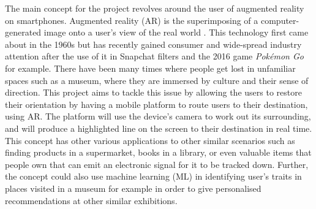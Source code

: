 The main concept for the project revolves around the user of augmented reality on smartphones. Augmented reality (AR) is the superimposing of a computer-generated image onto a user's view of the real world \cite{oxforddict}. This technology first came about in the 1960s but has recently gained consumer and wide-spread industry attention after the use of it in Snapchat filters and the 2016 game \textit{Pokémon Go} for example. There have been many times where people get lost in unfamiliar spaces such as a museum, where they are immersed by culture and their sense of direction. This project aims to tackle this issue by allowing the users to restore their orientation by having a mobile platform to route users to their destination, using AR. The platform will use the device's camera to work out its surrounding, and will produce a highlighted line on the screen to their destination in real time.\\ 

This concept has other various applications to other similar scenarios such as finding products in a supermarket, books in a library, or even valuable items that people own that can emit an electronic signal for it to be tracked down. Further, the concept could also use machine learning (ML) in identifying user's traits in places visited in a museum for example in order to give personalised recommendations at other similar exhibitions.